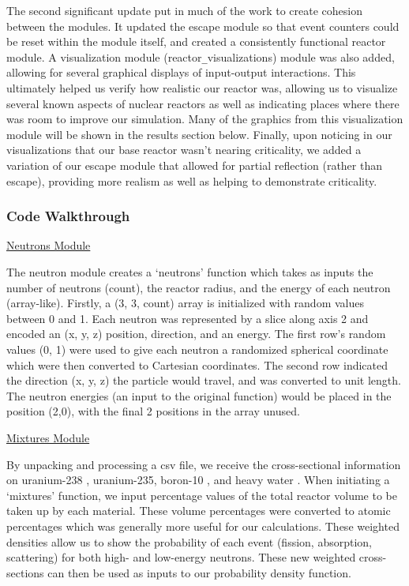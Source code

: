 \documentclass{notes}
\begin{document}
The second significant update put in much of the work to create cohesion between the modules. It updated the escape module so that event counters could be reset within the module itself, and created a consistently functional reactor module. A visualization module (reactor\verb|_|visualizations) module was also added, allowing for several graphical displays of input-output interactions. This ultimately helped us verify how realistic our reactor was, allowing us to visualize several known aspects of nuclear reactors as well as indicating places where there was room to improve our simulation. Many of the graphics from this visualization module will be shown in the results section below. Finally, upon noticing in our visualizations that our base reactor wasn't nearing criticality, we added a variation of our escape module that allowed for partial reflection (rather than escape), providing more realism as well as helping to demonstrate criticality.
\newpage
\subsubsection*{Code Walkthrough}

\ul{Neutrons Module}

The neutron module creates a `neutrons' function which takes as inputs the number of neutrons (count), the reactor radius, and the energy of each neutron (array-like). Firstly, a (3, 3, count) array is initialized with random values between 0 and 1. Each neutron was represented by a slice along axis 2 and encoded an (x, y, z) position, direction, and an energy. The first row's random values (0, 1) were used to give each neutron a randomized spherical coordinate which were then converted to Cartesian coordinates. The second row indicated the direction (x, y, z) the particle would travel, and was converted to unit length. The neutron energies (an input to the original function) would be placed in the position (2,0), with the final 2 positions in the array unused.

\ul{Mixtures Module}

By unpacking and processing a csv file, we receive the cross-sectional information on uranium-238 \cite{Kim, Andersen}, uranium-235, boron-10 \cite{Bogart}, and heavy water \cite{CrossSections}. When initiating a `mixtures' function, we input percentage values of the total reactor volume to be taken up by each material. These volume percentages were converted to atomic percentages which was generally more useful for our calculations. These weighted densities allow us to show the probability of each event (fission, absorption, scattering) for both high- and low-energy neutrons. These new weighted cross-sections can then be used as inputs to our probability density function.
\end{document}
